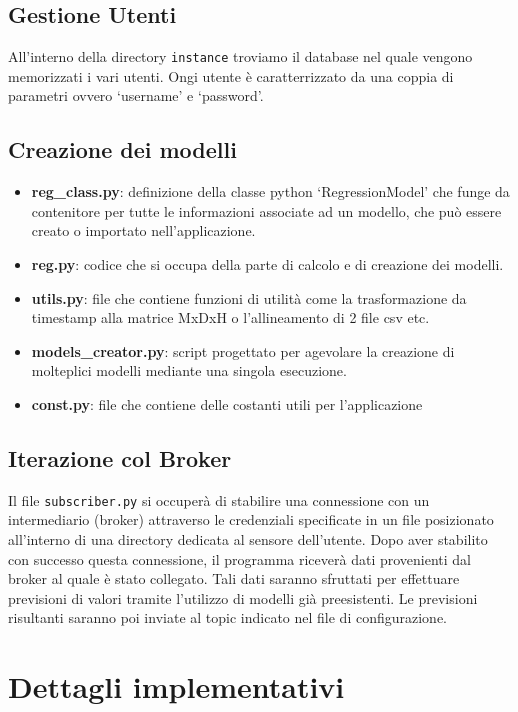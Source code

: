\documentclass[a4paper,10pt]{article}
\begin{document}
\subsection{Gestione Utenti}
All'interno della directory \texttt{instance} troviamo il database nel quale vengono memorizzati i vari utenti. Ongi utente è caratterrizzato
da una coppia di parametri ovvero `username' e `password'. 

\subsection{Creazione dei modelli}
\begin{itemize}
  \item \textbf{reg\_class.py}: definizione della classe python `RegressionModel' che funge da contenitore per tutte le
  informazioni associate ad un modello, che può essere creato o importato nell'applicazione.
  \item \textbf{reg.py}: codice che si occupa della parte di calcolo e di creazione dei modelli.
  \item \textbf{utils.py}: file che contiene funzioni di utilità come la trasformazione da timestamp alla matrice MxDxH o l'allineamento di 2 file csv etc.
  \item \textbf{models\_creator.py}: script progettato per agevolare la creazione di molteplici modelli mediante una singola esecuzione.
  \item \textbf{const.py}: file che contiene delle costanti utili per l'applicazione
\end{itemize}

\subsection{Iterazione col Broker}
Il file \texttt{subscriber.py} si occuperà di stabilire una connessione con un intermediario (broker) attraverso le credenziali specificate in 
un file posizionato all'interno di una directory dedicata al sensore dell'utente. Dopo aver stabilito con successo questa connessione, il programma riceverà 
dati provenienti dal broker al quale è stato collegato. Tali dati saranno sfruttati per effettuare previsioni di valori tramite l'utilizzo di modelli già preesistenti. 
Le previsioni risultanti saranno poi inviate al topic indicato nel file di configurazione.


\section{Dettagli implementativi}
\end{document}

